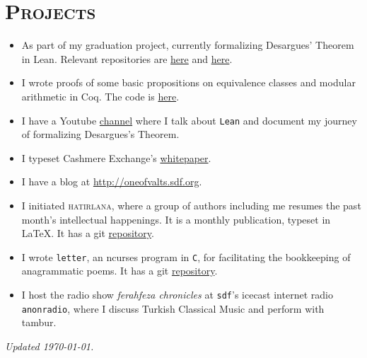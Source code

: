 \documentclass[oneside]{memoir}
\begin{document}
\section*{\textsc{Projects}}
\begin{itemize}[leftmargin=*]
  \item As part of my graduation project, currently formalizing
    Desargues' Theorem in Lean. Relevant repositories are
    \href{https://github.com/oneofvalts/desargues-doc}{here} and
    \href{https://github.com/oneofvalts/desargues}{here}.
  \item I wrote proofs of some basic propositions on equivalence classes
    and modular arithmetic in Coq. The code is
    \href{https://github.com/oneofvalts/equivalence-classes}{here}.
  \item I have a Youtube
    \href{https://www.youtube.com/@veryarticulateloudthinker}{channel}
    where I talk about \texttt{Lean} and document my journey of
    formalizing Desargues's Theorem.
  \item I typeset Cashmere Exchange's
    \href{https://docsend.com/view/ryp2wmfc5yxaabep}{whitepaper}.
  \item I have a blog at \url{http://oneofvalts.sdf.org}.
  \item I initiated \textsc{hatirlana}, where a group of authors including me
  resumes the past month's intellectual happenings. It is a monthly
  publication, typeset in \LaTeX. It has a git
  \href{https://github.com/oneofvalts/hatirlana}{repository}.
  \item I wrote \texttt{letter}, an ncurses program in \texttt{C}, for
  facilitating the bookkeeping of anagrammatic poems. It has a git
  \href{https://github.com/oneofvalts/letter}{repository}.
  \item I host the radio show \textit{ferahfeza chronicles} at \texttt{sdf}'s
  icecast internet radio \texttt{anonradio}, where I discuss Turkish
  Classical Music and perform with tambur.
\end{itemize}
\vfill\hfill{}\tiny\textit{Updated \today.}
\end{document}
